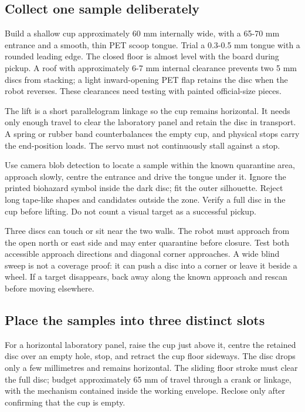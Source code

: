 \documentclass[10pt,a4paper]{article}
\begin{document}
\subsection{Collect one sample deliberately}
Build a shallow cup approximately 60 mm internally wide, with a 65-70 mm entrance and a smooth, thin PET scoop tongue. Trial a 0.3-0.5 mm tongue with a rounded leading edge. The closed floor is almost level with the board during pickup. A roof with approximately 6-7 mm internal clearance prevents two 5 mm discs from stacking; a light inward-opening PET flap retains the disc when the robot reverses. These clearances need testing with painted official-size pieces.

The lift is a short parallelogram linkage so the cup remains horizontal. It needs only enough travel to clear the laboratory panel and retain the disc in transport. A spring or rubber band counterbalances the empty cup, and physical stops carry the end-position loads. The servo must not continuously stall against a stop.

Use camera blob detection to locate a sample within the known quarantine area, approach slowly, centre the entrance and drive the tongue under it. Ignore the printed biohazard symbol inside the dark disc; fit the outer silhouette. Reject long tape-like shapes and candidates outside the zone. Verify a full disc in the cup before lifting. Do not count a visual target as a successful pickup.

Three discs can touch or sit near the two walls. The robot must approach from the open north or east side and may enter quarantine before closure. Test both accessible approach directions and diagonal corner approaches. A wide blind sweep is not a coverage proof: it can push a disc into a corner or leave it beside a wheel. If a target disappears, back away along the known approach and rescan before moving elsewhere.

\subsection{Place the samples into three distinct slots}
For a horizontal laboratory panel, raise the cup just above it, centre the retained disc over an empty hole, stop, and retract the cup floor sideways. The disc drops only a few millimetres and remains horizontal. The sliding floor stroke must clear the full disc; budget approximately 65 mm of travel through a crank or linkage, with the mechanism contained inside the working envelope. Reclose only after confirming that the cup is empty.
\end{document}

